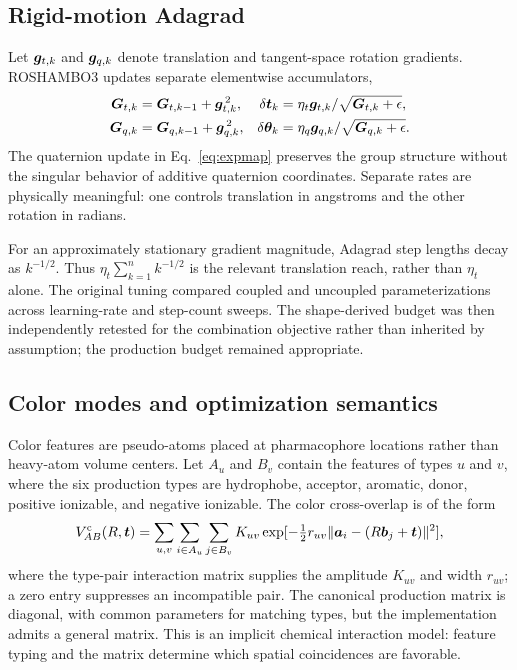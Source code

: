 \subsection{Rigid-motion Adagrad}

Let $\bm{g}_{t,k}$ and $\bm{g}_{q,k}$ denote translation and tangent-space
rotation gradients. ROSHAMBO3 updates separate elementwise accumulators,
\begin{align}
 \bm{G}_{t,k}&=\bm{G}_{t,k-1}+\bm{g}_{t,k}^{\,2}, &
 \delta\bm{t}_k&=\eta_t\bm{g}_{t,k}/\sqrt{\bm{G}_{t,k}+\epsilon},\\
 \bm{G}_{q,k}&=\bm{G}_{q,k-1}+\bm{g}_{q,k}^{\,2}, &
 \delta\bm{\theta}_k&=\eta_q\bm{g}_{q,k}/\sqrt{\bm{G}_{q,k}+\epsilon}.
\end{align}
The quaternion update in Eq.~\ref{eq:expmap} preserves the group structure
without the singular behavior of additive quaternion coordinates. Separate
rates are physically meaningful: one controls translation in angstroms and the
other rotation in radians.

For an approximately stationary gradient magnitude, Adagrad step lengths decay
as $k^{-1/2}$. Thus $\eta_t\sum_{k=1}^{n}k^{-1/2}$ is the relevant translation
reach, rather than $\eta_t$ alone. The original tuning compared coupled and
uncoupled parameterizations across learning-rate and step-count sweeps. The
shape-derived budget was then independently retested for the combination
objective rather than inherited by assumption; the production budget remained
appropriate.

\subsection{Color modes and optimization semantics}

Color features are pseudo-atoms placed at pharmacophore locations rather than
heavy-atom volume centers. Let $A_u$ and $B_v$ contain the features of types
$u$ and $v$, where the six production types are hydrophobe, acceptor, aromatic,
donor, positive ionizable, and negative ionizable. The color cross-overlap is
of the form
\begin{equation}
 V^{\rm c}_{AB}(R,\bm{t})=
 \sum_{u,v}\sum_{i\in A_u}\sum_{j\in B_v}
 K_{uv}\exp[-\tfrac12 r_{uv}
 \|\bm{a}_i-(R\bm{b}_j+\bm{t})\|^2],
 \label{eq:color-overlap}
\end{equation}
where the type-pair interaction matrix supplies the amplitude $K_{uv}$ and
width $r_{uv}$; a zero entry suppresses an incompatible pair. The canonical
production matrix is diagonal, with common parameters for matching types, but
the implementation admits a general matrix. This is an implicit chemical
interaction model: feature typing and the matrix determine which spatial
coincidences are favorable.

